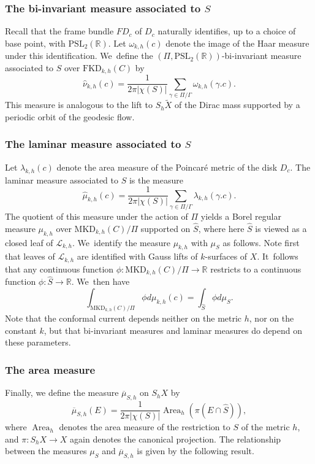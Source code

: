 \documentclass[JEP,XML,SOM,Unicode,NoEqCountersInSection,published]{cedram}
\newcommand{\ksurfaces}{$k$\nobreakdash-surfaces\xspace}
\theoremstyle{plain}
\theoremstyle{definition}
\newcommand\PSL{\mathrm{PSL}_2(\mathbb{R})}
\newcommand{\R}{{\mathbb R}}
\newcommand{\cL}{{\mathcal L}}
\newcommand{\MKD}{\mathrm{MKD}}
\newcommand{\FKD}{\mathrm{FKD}}
\DeclareMathOperator{\Area}{Area}
\begin{document}
\subsubsection*{The bi-invariant measure associated to $S$}
Recall that the frame bundle $FD_c$ of $D_c$ naturally identifies, up to a choice of base point, with $\PSL$. Let $\omega_{k,h}(c)$ denote the image of the Haar measure under this identification. We~define the $(\Pi,\PSL)$-bi-invariant measure associated to $S$ over $\FKD_{k,h}(C)$ by
\begin{equation*}
\hat\nu_{k,h}(c)=\frac{1}{2\pi|\chi(S)|}\sum_{\gamma\in\Pi/\Gamma}\omega_{k,h}(\gamma.c).
\end{equation*}
This measure is analogous to the lift to $S_h \tilde X$ of the Dirac mass supported by a periodic orbit of the geodesic flow.

\subsubsection*{The laminar measure associated to $S$} Let $\lambda_{k,h}(c)$ denote the area measure of the Poincaré metric of the disk $D_c$. The laminar measure associated to $S$ is the measure
\begin{equation*}
\hat\mu_{k,h}(c)=\frac{1}{2\pi|\chi(S)|}\sum_{\gamma\in\Pi/\Gamma}\lambda_{k,h}(\gamma.c).
\end{equation*}
The quotient of this measure under the action of $\Pi$ yields a Borel regular measure $\mu_{k,h}$ over $\MKD_{k,h}(C)/\Pi$ supported on $\hat S$, where here $\hat S$ is viewed as a closed leaf of $\cL_{k,h}$. We~identify the measure $\mu_{k,h}$ with $\mu_S$ as follows. Note first that leaves of $\cL_{k,h}$ are identified with Gauss lifts of \ksurfaces of $X$. It~follows that any continuous function $\phi:\MKD_{k,h}(C)/\Pi\to\R$ restricts to a continuous function $\phi:\hat S\to\R$. We~then have
\begin{equation}\label{eq.ident_measures}
\int_{\MKD_{k,h}(C)/\Pi} \phi d\mu_{k,h}(c)=\int_{\hat S}\phi d\mu_S.
\end{equation}
Note that the conformal current depends neither on the metric $h$, nor on the constant $k$, but that bi-invariant measures and laminar measures do depend on these parameters.

\subsubsection*{The area measure} Finally, we define the measure $\overline{\mu}_{S,h}$ on $S_hX$ by
\begin{equation}\label{eq.area_measure}
\overline{\mu}_{S,h}(E)=\frac{1}{2\pi|\chi(S)|}\Area_h(\pi(E\cap\hat S)),
\end{equation}
where $\Area_h$ denotes the area measure of the restriction to $S$ of the metric $h$, and $\pi:S_hX\to X$ again denotes the canonical projection. The relationship between the measures $\mu_S$ and $\overline\mu_{S,h}$ is given by the following result.
\end{document}
